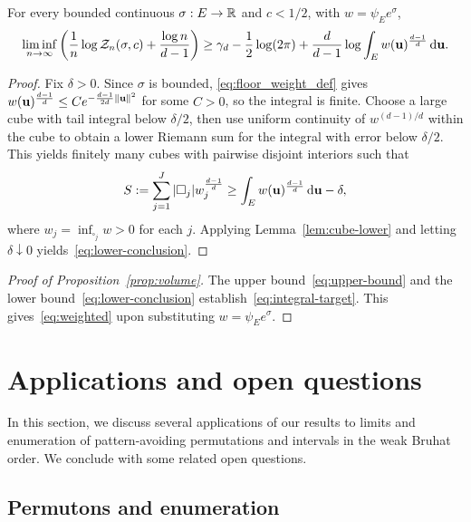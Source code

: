 \documentclass[11pt,letterpaper]{article}
\begin{document}
\begin{lemma}\label{lem:lower}
      For every bounded continuous $\sigma:E\to\mathbb R$ and $c<1/2$, with $w=\psi_Ee^\sigma$,
      \begin{equation}\label{eq:lower-conclusion}
            \liminf_{n\to\infty}\left(\frac1n\log\mathcal Z_n(\sigma,c)+\frac{\log n}{d-1}\right)
            \ge\gamma_d-\frac12\log(2\pi)+\frac d{d-1}\log\int_Ew(\mathbf u)^{\frac{d-1}{d}}\,\mathrm d\mathbf u.
      \end{equation}
\end{lemma}
\begin{proof}
      Fix $\delta>0$. Since $\sigma$ is bounded, \eqref{eq:floor_weight_def} gives $w(\mathbf u)^{\frac{d-1}{d}}\le C e^{-\frac{d-1}{2d}\|\mathbf u\|^2}$ for some $C>0$, so the integral is finite. Choose a large cube with tail integral below $\delta/2$, then use uniform continuity of $w^{(d-1)/d}$ within the cube to obtain a lower Riemann sum for the integral with error below $\delta/2$. This yields finitely many cubes with pairwise disjoint interiors such that
      \[
            S:=\sum_{j=1}^J|\square_j|w_j^{\frac{d-1}{d}}\ge\int_Ew(\mathbf u)^{\frac{d-1}{d}}\,\mathrm d\mathbf u-\delta,
      \]
      where $w_j=\inf_{\square_j}w>0$ for each $j$. Applying Lemma~\ref{lem:cube-lower} and letting $\delta\downarrow0$ yields~\eqref{eq:lower-conclusion}.
\end{proof}

\begin{proof}[Proof of Proposition~\ref{prop:volume}]
      The upper bound~\eqref{eq:upper-bound} and the lower bound~\eqref{eq:lower-conclusion} establish~\eqref{eq:integral-target}. This gives~\eqref{eq:weighted} upon substituting $w=\psi_Ee^\sigma$.
\end{proof}

\section{Applications and open questions}\label{sec:applications}
In this section, we discuss several applications of our results to limits and enumeration of pattern-avoiding permutations and intervals in the weak Bruhat order. We conclude with some related open questions.

\subsection{Permutons and enumeration}\label{sec:ranks}
\end{document}
